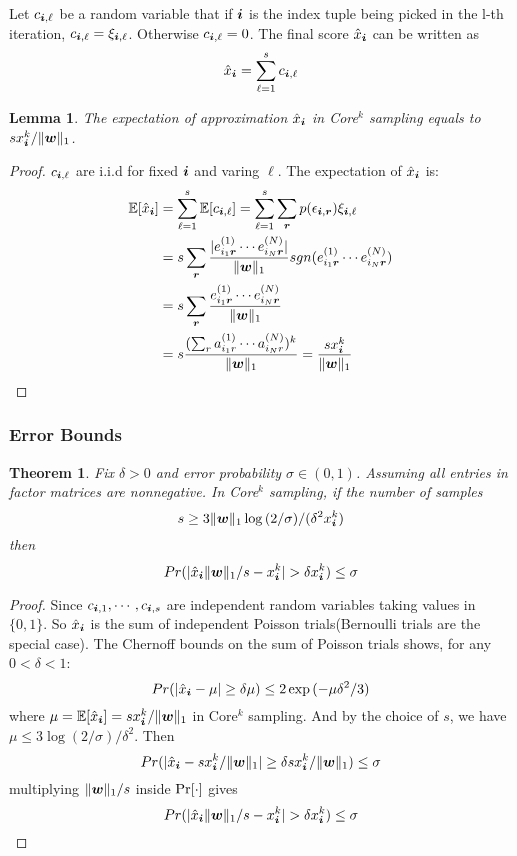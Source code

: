 \documentclass[10pt,journal,compsoc]{IEEEtran}
\newcommand{\Sca}[3]{{#1}^{(#2)}_{i_#2#3}}%
\newcommand{\anr}[2]{\Sca{a}{#1}{#2}}
\newcommand{\enr}[2]{\Sca{e}{#1}{\V{#2}}}
\newcommand{\score}[1]{\xi_{\V{i},#1}}
\newcommand{\V}[1]{{\boldsymbol{{\MakeLowercase{#1}}}}}
\newcommand{\predx}{\hat{x}_{\V{i}}}
\newcommand{\norm}[2]{\|#1\|_{#2}}
\newtheorem{lemma}{Lemma}
\newtheorem{theorem}{Theorem}
\begin{document}
Let $c_{\V{i},\ell}$ be a random variable that if $\V{i}$ is the index tuple 
being picked in the l-th iteration, $c_{\V{i},\ell}=\score{\ell}$. 
Otherwise $c_{\V{i},\ell}=0$. 
The final score $\predx$ can be written as
\begin{equation}\label{eq:score}
\predx = \sum_{\ell=1}^{s} c_{\V{i},\ell}
\end{equation}
\begin{lemma}\label{lem:Expectation}
	The expectation of approximation $\hat{x}_{\V{i}}$ in Core$^k$ sampling equals to $sx^k_{\V{i}}/\norm{\V{w}}{1}$.
\end{lemma}
\begin{proof}
	$c_{\V{i},\ell}$ are i.i.d for fixed $\V{i}$ and varing $\ell$. 
	The expectation of $\predx$ is:
	\begin{align*}
	\mathbb{E}[\predx]
	& = \sum_{\ell=1}^{s}\mathbb{E}[c_{\V{i},\ell}] = \sum_{\ell=1}^{s}\sum_{\V{r}} p(\epsilon_{\V{i},\V{r}})\score{\ell} \\
	& = s\sum_{\V{r}} \frac{|\enr{1}{r}\cdots\enr{N}{r}|}{\norm{\V{W}}{1}}
	sgn(\enr{1}{r}\cdots\enr{N}{r})\\
	& = s\sum_{\V{r}} \frac{\enr{1}{r}\cdots\enr{N}{r}}{\norm{\V{W}}{1}}\\
	& = s\frac{(\sum_{r}\anr{1}{r}\cdots\anr{N}{r})^k}{\norm{\V{W}}{1}}
	= \frac{sx^k_{\V{i}}}{\norm{\V{w}}{1}}
	\end{align*}
\end{proof}

\subsubsection{Error Bounds}
\begin{theorem}\label{theo:Bound}
	Fix $\delta > 0$ and error probability $\sigma \in (0,1)$.
	Assuming all entries in factor matrices are nonnegative.
	In Core$^k$ sampling, if the number of samples
	\[
	s \geq 3\norm{\V{w}}{1}\log{(2/\sigma)}/(\delta^2 x^k_{\V{i}})
	\]
	then
	\[
	Pr(|\predx\norm{\V{W}}{1}/s - x^k_{\V{i}}| > \delta x^k_{\V{i}}) \leq \sigma
	\]
\end{theorem}

\begin{proof}
	Since  $c_{\V{i},1},\cdots,c_{\V{i},s}$
	are independent random variables taking values in $\{0,1\}$.
	So $\predx$ is the sum of independent Poisson trials(Bernoulli trials are the special case).
	The Chernoff bounds on the sum of Poisson trials shows, for any $0 <\delta <1 $:
	\[
	Pr(|\predx - \mu|\geq\delta\mu) \leq 2\exp{(-\mu\delta^2/3)}
	\]
	where $\mu=\mathbb{E}[\predx]=sx^k_{\V{i}}/\norm{\V{W}}{1}$ in Core$^k$ sampling.
	And by the choice of $s$, we have
	$\mu\leq 3\log{(2/\sigma)/\delta^2}$.
	Then
	\[
	Pr(|\predx-sx^k_{\V{i}}/\norm{\V{W}}{1}|\geq\delta sx^k_{\V{i}}/\norm{\V{W}}{1}) \leq \sigma
	\]
	multiplying $\norm{\V{W}}{1}/s$ inside ${\rm Pr}[\cdot]$ gives
	\[
	Pr(|\predx\norm{\V{W}}{1}/s - x^k_{\V{i}}| > \delta x^k_{\V{i}}) \leq \sigma
	\]
\end{proof}
\end{document}
